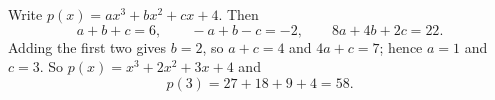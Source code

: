 Write $p(x)=ax^3+bx^2+cx+4$. Then
\[
a+b+c=6,\qquad -a+b-c=-2,\qquad 8a+4b+2c=22 .
\]
Adding the first two gives $b=2$, so $a+c=4$ and $4a+c=7$; hence $a=1$ and $c=3$. So $p(x)=x^3+2x^2+3x+4$ and
\[
p(3)=27+18+9+4=\boxed{58}.
\]
